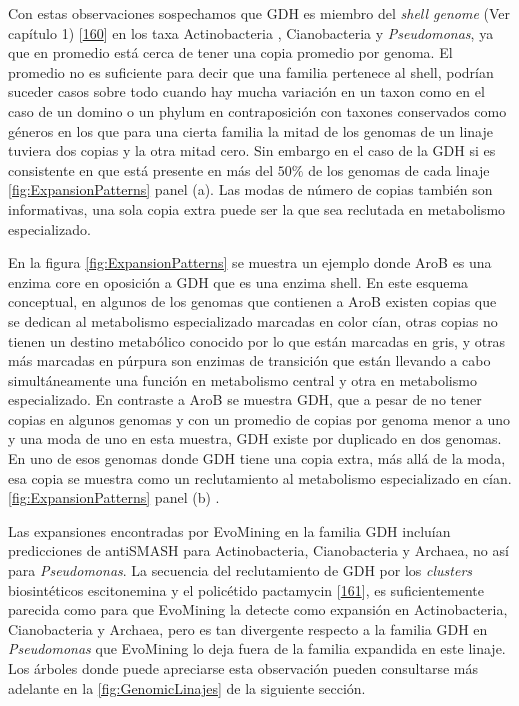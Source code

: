 \documentclass[12pt,twoside]{reedthesis}
\begin{document}
  Con estas observaciones sospechamos que GDH es miembro del \emph{shell
  genome} (Ver capítulo 1)
  {[}\protect\hyperlink{ref-koonin_genomics_2008}{160}{]} en los taxa
  Actinobacteria , Cianobacteria y \emph{Pseudomonas}, ya que en promedio
  está cerca de tener una copia promedio por genoma. El promedio no es
  suficiente para decir que una familia pertenece al shell, podrían
  suceder casos sobre todo cuando hay mucha variación en un taxon como en
  el caso de un domino o un phylum en contraposición con taxones
  conservados como géneros en los que para una cierta familia la mitad de
  los genomas de un linaje tuviera dos copias y la otra mitad cero. Sin
  embargo en el caso de la GDH si es consistente en que está presente en
  más del \(50\%\) de los genomas de cada linaje
  \autoref{fig:ExpansionPatterns} panel (a). Las modas de número de copias
  también son informativas, una sola copia extra puede ser la que sea
  reclutada en metabolismo especializado.
  
  En la figura \autoref{fig:ExpansionPatterns} se muestra un ejemplo donde
  AroB es una enzima core en oposición a GDH que es una enzima shell. En
  este esquema conceptual, en algunos de los genomas que contienen a AroB
  existen copias que se dedican al metabolismo especializado marcadas en
  color cían, otras copias no tienen un destino metabólico conocido por lo
  que están marcadas en gris, y otras más marcadas en púrpura son enzimas
  de transición que están llevando a cabo simultáneamente una función en
  metabolismo central y otra en metabolismo especializado. En contraste a
  AroB se muestra GDH, que a pesar de no tener copias en algunos genomas y
  con un promedio de copias por genoma menor a uno y una moda de uno en
  esta muestra, GDH existe por duplicado en dos genomas. En uno de esos
  genomas donde GDH tiene una copia extra, más allá de la moda, esa copia
  se muestra como un reclutamiento al metabolismo especializado en cían.
  \autoref{fig:ExpansionPatterns} panel (b) .
  
  Las expansiones encontradas por EvoMining en la familia GDH incluían
  predicciones de antiSMASH para Actinobacteria, Cianobacteria y Archaea,
  no así para \emph{Pseudomonas}. La secuencia del reclutamiento de GDH
  por los \emph{clusters} biosintéticos escitonemina y el policétido
  pactamycin {[}\protect\hyperlink{ref-kudo_cloning_2007}{161}{]}, es
  suficientemente parecida como para que EvoMining la detecte como
  expansión en Actinobacteria, Cianobacteria y Archaea, pero es tan
  divergente respecto a la familia GDH en \emph{Pseudomonas} que EvoMining
  lo deja fuera de la familia expandida en este linaje. Los árboles donde
  puede apreciarse esta observación pueden consultarse más adelante en la
  \autoref{fig:GenomicLinajes} de la siguiente sección.
  
\end{document}
